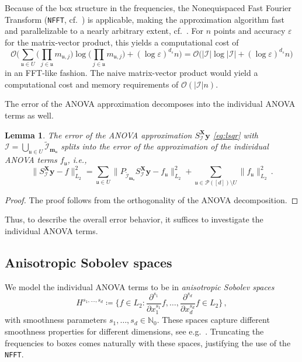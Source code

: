 \documentclass[a4paper]{scrartcl}
\numberwithin{equation}{section}
\newtheorem{lemma}[theorem]{Lemma}
\renewcommand{\tilde}{\widetilde}
\begin{document}
Because of the box structure in the frequencies, the Nonequispaced Fast Fourier Transform (\texttt{NFFT}, cf.~\cite{KKP09}) is applicable, making the approximation algorithm fast and parallelizable to a nearly arbitrary extent, cf.~\cite{BPS22, Schmischke22}.
For $n$ points and accuracy $\varepsilon$ for the matrix-vector product, this yields a computational cost of
\begin{equation*}
    \mathcal O\Big(\sum_{\mathfrak u\in U} \Big( \prod_{j\in \mathfrak u} m_{\mathfrak u,j} \Big) \log \Big( \prod_{j\in \mathfrak u} m_{\mathfrak u,j} \Big) + (\log\varepsilon)^{d_s}n\Big)
    = \mathcal O\Big(|\mathcal I|\log|\mathcal I| + (\log\varepsilon)^{d_s}n\Big)
\end{equation*}
in an FFT-like fashion.
The naive matrix-vector product would yield a computational cost and memory requirements of $\mathcal O(|\mathcal I|n)$.

The error of the ANOVA approximation decomposes into the individual ANOVA terms as well.

\begin{lemma}\label{anovaerror} The error of the ANOVA approximation $S_{\mathcal I}^{\bm X}\bm y$ \eqref{eq:lsqr} with $\mathcal I = \bigcup_{\mathfrak u\in U} \tilde{\mathcal I}_{\bm m_{\mathfrak u}}$ splits into the error of the approximation of the individual ANOVA terms $f_{\mathfrak u}$, i.e.,
    \begin{equation*}
        \|S_{\mathcal I}^{\bm X}\bm y - f\|_{L_2}^2
        = \sum_{\mathfrak u\in U} \|P_{\tilde{\mathcal I}_{\bm m_{\mathfrak u}}} S_{\mathcal I}^{\bm X}\bm y - f_{\mathfrak u}\|_{L_2}^{2} + \sum_{\mathfrak u\in \mathcal P([d])\setminus U} \|f_{\mathfrak u}\|_{L_2}^2 \,.
    \end{equation*}
\end{lemma} 

\begin{proof} The proof follows from the orthogonality of the ANOVA decomposition.
\end{proof} 

Thus, to describe the overall error behavior, it suffices to investigate the individual ANOVA terms.



\subsection{Anisotropic Sobolev spaces}\label{sec:anisosobolev} 

We model the individual ANOVA terms to be in \emph{anisotropic Sobolev spaces}
\begin{equation*}
    H^{s_1, \dots, s_d}
    \coloneqq \Big\{
    f\in L_2 :
    \frac{\partial^{s_1}}{\partial x_1^{s_1}}f, \dots, \frac{\partial^{s_d}}{\partial x_d^{s_d}}f \in L_2
    \Big\} \,,
\end{equation*}
with smoothness parameters $s_1, \dots, s_d\in\mathds N_0$.
These spaces capture different smoothness properties for different dimensions, see e.g.~\cite{Nikolskii75}.
Truncating the frequencies to boxes comes naturally with these spaces, justifying the use of the \texttt{NFFT}.
\end{document}
